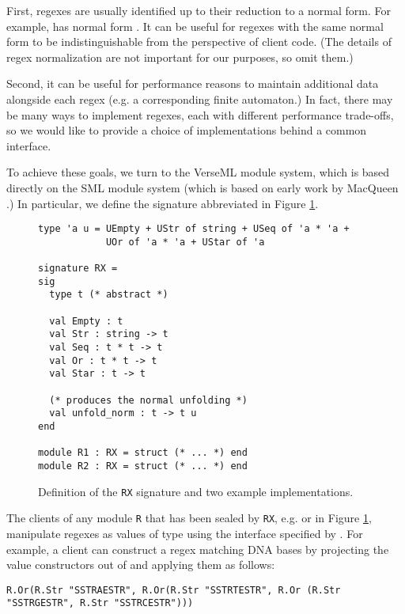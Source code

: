 First, regexes are usually identified up to their reduction to a normal form. For example,  has normal form . It can be useful for regexes with the same normal form to be  indistinguishable from the perspective of client code. (The details of regex normalization are not important for our purposes, so omit them.)

Second, it can be useful for performance reasons to maintain additional data alongside each regex (e.g. a corresponding finite automaton.) In fact, there may be many ways to implement regexes, each with different performance trade-offs, so we would like to provide a choice of implementations behind a common interface.

To achieve these goals, we turn to the VerseML module system, which is based directly on the SML module system (which is based on early work by MacQueen \cite{MacQueen:1984:MSM:800055.802036}.) In particular, we define the {signature} abbreviated  in Figure \ref{fig:signature-RX}.

\begin{figure}[ht]
\begin{lstlisting}[deletekeywords={case}]
type 'a u = UEmpty + UStr of string + USeq of 'a * 'a + 
            UOr of 'a * 'a + UStar of 'a

signature RX = 
sig
  type t (* abstract *)

  val Empty : t
  val Str : string -> t
  val Seq : t * t -> t
  val Or : t * t -> t
  val Star : t -> t

  (* produces the normal unfolding *)
  val unfold_norm : t -> t u
end

module R1 : RX = struct (* ... *) end
module R2 : RX = struct (* ... *) end
\end{lstlisting}
\vspace{-5px}
\caption{Definition of the \lstinline{RX} signature and two example implementations.}
\label{fig:signature-RX}
\end{figure}

The clients of any module \lstinline{R} that has been sealed by \lstinline{RX}, e.g.  or   in Figure \ref{fig:signature-RX}, manipulate regexes as values of type  using the interface specified by . For example, a client can construct a regex matching DNA bases by projecting the value constructors out of  and applying them as follows:
\begin{lstlisting}[numbers=none]
R.Or(R.Str "SSTRAESTR", R.Or(R.Str "SSTRTESTR", R.Or (R.Str "SSTRGESTR", R.Str "SSTRCESTR")))
\end{lstlisting}

